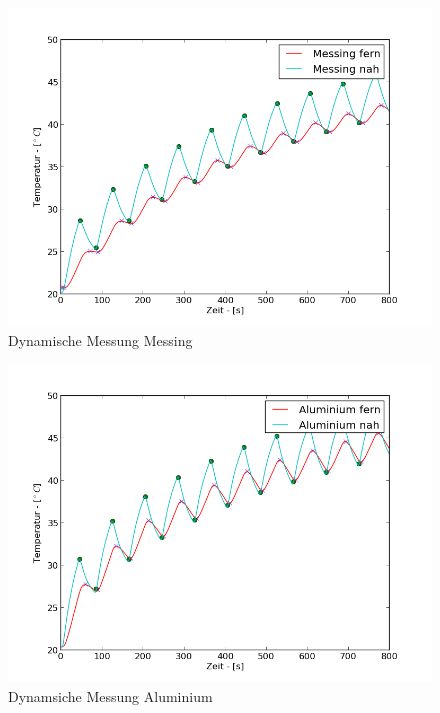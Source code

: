 \documentclass[11pt]{article}
\begin{document}
\begin{figure}[htp]
\centering
\includegraphics[width=\textwidth]{Diagramme/dyn_messing.png}
\caption{Dynamische Messung Messing}
\label{dyn_messing}
\end{figure}
\begin{figure}[htp]
\centering
\includegraphics[width=\textwidth]{Diagramme/dyn_alu.png}
\caption{Dynamsiche Messung Aluminium}
\label{dyn_alu}
\end{figure}
\end{document}
